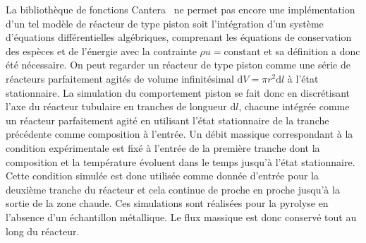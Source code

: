 La bibliothèque de fonctions Cantera~\cite{Cantera2014} ne permet pas encore une implémentation d'un tel modèle de réacteur de type piston \textendash{} soit l'intégration d'un système d'équations différentielles algébriques, comprenant les équations de conservation des espèces et de l'énergie avec la contrainte $\rho{}u=\text{constant}$ \textendash{} et sa définition a donc été nécessaire. On peut regarder un réacteur de type piston comme une série de réacteurs parfaitement agités de volume infinitésimal $\mathrm{d}V=\pi{}r^{2}\mathrm{d}l$ à l'état stationnaire. La simulation du comportement \og{}piston\fg{} se fait donc en discrétisant l'axe du réacteur tubulaire en tranches de longueur $\mathrm{d}l$, chacune intégrée comme un réacteur parfaitement agité en utilisant l'état stationnaire de la tranche précédente comme composition à l'entrée. Un débit massique correspondant à la condition expérimentale est fixé à l'entrée de la première tranche dont la composition et la température évoluent dans le temps jusqu'à l'état stationnaire. Cette condition simulée est donc utilisée comme donnée d'entrée pour la deuxième tranche du réacteur et cela continue de proche en proche jusqu'à la sortie de la zone chaude. Ces simulations sont réalisées pour la pyrolyse en l'absence d'un échantillon métallique. Le flux massique est donc conservé tout au long du réacteur. 

